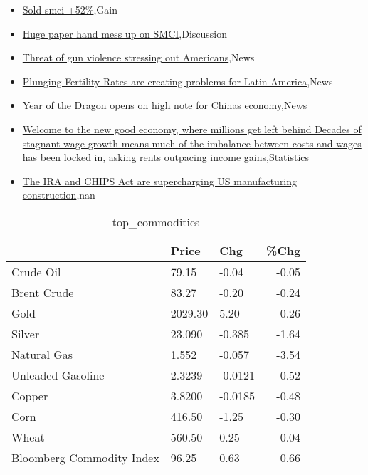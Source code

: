 \documentclass{article}%
\begin{document}
%
\begin{itemize}%
\item%
\href{https://reddit.com/r/wallstreetbets/comments/1auit2f/sold\_smci\_52/}{Sold smci +52\%},Gain%
\item%
\href{https://reddit.com/r/wallstreetbets/comments/1aufc9w/huge\_paper\_hand\_mess\_up\_on\_smci/}{Huge paper hand mess up on SMCI},Discussion%
\item%
\href{https://reddit.com/r/Economics/comments/1auk758/threat\_of\_gun\_violence\_stressing\_out\_americans/}{Threat of gun violence stressing out Americans},News%
\item%
\href{https://reddit.com/r/Economics/comments/1au9mv0/plunging\_fertility\_rates\_are\_creating\_problems/}{Plunging Fertility Rates are creating problems for Latin America},News%
\item%
\href{https://reddit.com/r/Economics/comments/1au7vmo/year\_of\_the\_dragon\_opens\_on\_high\_note\_for\_chinas/}{Year of the Dragon opens on high note for Chinas economy},News%
\item%
\href{https://reddit.com/r/Economics/comments/1au6vno/welcome\_to\_the\_new\_good\_economy\_where\_millions/}{Welcome to the new good economy, where millions get left behind  Decades of stagnant wage growth means much of the imbalance between costs and wages has been locked in, asking rents outpacing income gains},Statistics%
\item%
\href{https://reddit.com/r/Economics/comments/1au6bf0/the\_ira\_and\_chips\_act\_are\_supercharging\_us/}{The IRA and CHIPS Act are supercharging US manufacturing construction},nan%
\end{itemize}%


\begin{table}[htbp]%
\caption{top\_commodities}%
\centering%
\begin{adjustbox}{width=1\textwidth}%
\begin{tabular}{lllr}
\toprule
                          &   Price &     Chg &  \%Chg \\
\midrule
               Crude Oil  &   79.15 &   -0.04 & -0.05 \\
             Brent Crude  &   83.27 &   -0.20 & -0.24 \\
                    Gold  & 2029.30 &    5.20 &  0.26 \\
                  Silver  &  23.090 &  -0.385 & -1.64 \\
             Natural Gas  &   1.552 &  -0.057 & -3.54 \\
       Unleaded Gasoline  &  2.3239 & -0.0121 & -0.52 \\
                  Copper  &  3.8200 & -0.0185 & -0.48 \\
                    Corn  &  416.50 &   -1.25 & -0.30 \\
                   Wheat  &  560.50 &    0.25 &  0.04 \\
Bloomberg Commodity Index &   96.25 &    0.63 &  0.66 \\
\bottomrule
\end{tabular}
%
\end{adjustbox}%
\end{table}
\end{document}
